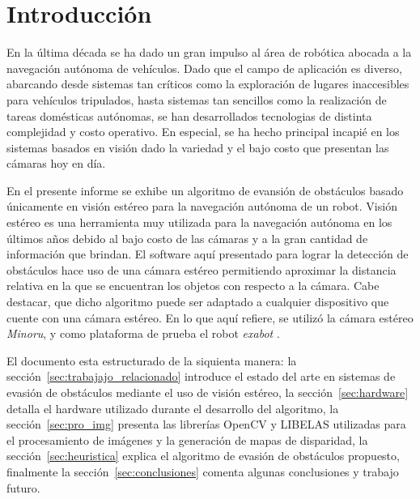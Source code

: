 \documentclass[journal]{IEEEtran}
\begin{document}
%
\IEEEpeerreviewmaketitle


\section{Introducci\'on}


En la \'ultima d\'ecada se ha dado un gran impulso al \'area de rob\'otica abocada a la navegaci\'on aut\'onoma de veh\'iculos. Dado que el campo de aplicaci\'on es diverso, abarcando desde sistemas tan cr\'iticos como la exploraci\'on de lugares inaccesibles para veh\'iculos tripulados, hasta sistemas tan sencillos como la realizaci\'on de tareas dom\'esticas aut\'onomas, se han desarrollados tecnologias de distinta complejidad y costo operativo. En especial, se ha hecho principal incapi\'e en los sistemas basados en visi\'on dado la variedad y el bajo costo que presentan las c\'amaras hoy en d\'ia.

En el presente informe se exhibe un algoritmo de evansi\'on de obst\'aculos basado \'unicamente en visi\'on est\'ereo para la navegaci\'on aut\'onoma de un robot. Visi\'on est\'ereo es una herramienta muy utilizada para la navegaci\'on aut\'onoma en los \'ultimos a\~nos debido al bajo costo de las c\'amaras y a la gran cantidad de informaci\'on que brindan. El software aqu\'i presentado para lograr la detecci\'on de obst\'aculos hace uso de una c\'amara est\'ereo permitiendo aproximar la distancia relativa en la que se encuentran los objetos con respecto a la c\'amara.
Cabe destacar, que dicho algoritmo puede ser adaptado a cualquier dispositivo que cuente con una c\'amara est\'ereo. En lo que aqu\'i refiere, se utiliz\'o la c\'amara est\'ereo \emph{Minoru}, y como plataforma de prueba el robot \emph{exabot} \cite{DPSC09}.


El documento esta estructurado de la siquienta manera: la secci\'on~\ref{sec:trabajajo_relacionado} introduce el estado del arte en sistemas de evasi\'on de obst\'aculos mediante el uso de visi\'on est\'ereo, la secci\'on~\ref{sec:hardware} detalla el hardware utilizado durante el desarrollo del algoritmo, la secci\'on~\ref{sec:pro_img} presenta las librer\'ias OpenCV y LIBELAS utilizadas para el procesamiento de im\'agenes y la generaci\'on de mapas de disparidad, la secci\'on~\ref{sec:heuristica} explica el algoritmo de evasi\'on de obst\'aculos propuesto, finalmente la secci\'on~\ref{sec:conclusiones} comenta algunas conclusiones y trabajo futuro.
\end{document}
